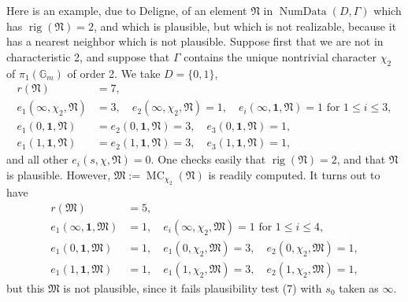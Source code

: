 Here is an example, due to Deligne, of an element \(\mathfrak{N}\) in \(\operatorname{NumData}(D,\Gamma)\) which has \(\operatorname{rig}(\mathfrak{N})=2\), and which is plausible, but which is not realizable, because it has a nearest neighbor which is not plausible. Suppose first that we are not in characteristic 2, and suppose that \(\Gamma\) contains the unique nontrivial character \(\chi_2\) of \(\pi_1(\mathbb{G}_m)\) of order 2. We take \(D=\{0,1\}\),
\[
\begin{aligned}
r(\mathfrak{N})&=7,\\
e_1(\infty,\chi_2,\mathfrak{N})&=3,\quad e_2(\infty,\chi_2,\mathfrak{N})=1,\quad e_i(\infty,\mathbf{1},\mathfrak{N})=1\text{ for }1\leq i\leq 3,\\
e_1(0,\mathbf{1},\mathfrak{N})&=e_2(0,\mathbf{1},\mathfrak{N})=3,\quad e_3(0,\mathbf{1},\mathfrak{N})=1,\\
e_1(1,\mathbf{1},\mathfrak{N})&=e_2(1,\mathbf{1},\mathfrak{N})=3,\quad e_3(1,\mathbf{1},\mathfrak{N})=1,
\end{aligned}
\]
and all other \(e_i(s,\chi,\mathfrak{N})=0\). One checks easily that \(\operatorname{rig}(\mathfrak{N})=2\), and that \(\mathfrak{N}\) is plausible. However, \(\mathfrak{M}:=\operatorname{MC}_{\chi_2}(\mathfrak{N})\) is readily computed. It turns out to have
\[
\begin{aligned}
r(\mathfrak{M})&=5,\\
e_1(\infty,\mathbf{1},\mathfrak{M})&=1,\quad e_i(\infty,\chi_2,\mathfrak{M})=1\text{ for }1\leq i\leq 4,\\
e_1(0,\mathbf{1},\mathfrak{M})&=1,\quad e_1(0,\chi_2,\mathfrak{M})=3,\quad e_2(0,\chi_2,\mathfrak{M})=1,\\
e_1(1,\mathbf{1},\mathfrak{M})&=1,\quad e_1(1,\chi_2,\mathfrak{M})=3,\quad e_2(1,\chi_2,\mathfrak{M})=1,
\end{aligned}
\]
but this \(\mathfrak{M}\) is not plausible, since it fails plausibility test (7) with \(s_0\) taken as \(\infty\).

